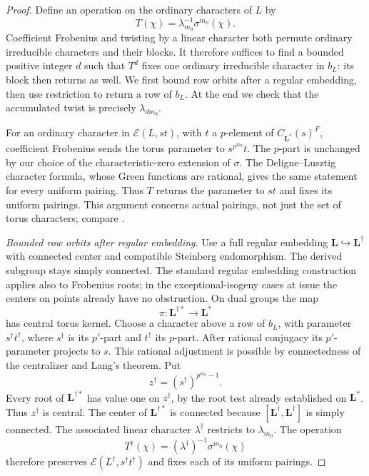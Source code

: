 \begin{proof}
Define an operation on the ordinary characters of $L$ by
\[
 T(\chi)=\lambda_{m_0}^{-1}\sigma^{m_0}(\chi).
\]
Coefficient Frobenius and twisting by a linear character both
permute ordinary irreducible characters and their blocks.  It
therefore suffices to find a bounded positive integer $d$ such
that $T^d$ fixes one ordinary irreducible character in $b_L$: its
block then returns as well.  We first bound row orbits after a
regular embedding, then use restriction to return a row of $b_L$.
At the end we check that the accumulated twist is precisely
$\lambda_{d m_0}$.

For an ordinary character in $\mathcal E(L,st)$, with $t$ a
$p$-element of $C_{\mathbf L^*}(s)^F$, coefficient Frobenius sends
the torus parameter to $s^{p^{m_0}}t$.  The $p$-part is unchanged
by our choice of the characteristic-zero extension of $\sigma$.
The Deligne--Lusztig character formula, whose Green functions are
rational, gives the same statement for every uniform pairing.
Thus $T$ returns the parameter to $st$ and fixes its uniform pairings.
This argument concerns actual pairings, not just the set of torus
characters; compare \cite[Lemma~3.6(i)]{FarrellKessar}.

\emph{Bounded row orbits after regular embedding.}
Use a full regular embedding
$\mathbf L\hookrightarrow\mathbf L^\dagger$ with connected center
and compatible Steinberg endomorphism.  The derived subgroup stays
simply connected.  The standard regular embedding construction
applies also to Frobenius roots; in the exceptional-isogeny cases
at issue the centers on points already have no obstruction.
On dual groups the map
\[
 \pi:\mathbf L^{\dagger *}\longrightarrow\mathbf L^*
\]
has central torus kernel.  Choose a character above a row of $b_L$,
with parameter $s^\dagger t^\dagger$, where $s^\dagger$ is its
$p'$-part and $t^\dagger$ its $p$-part.  After rational conjugacy its
$p'$-parameter projects to $s$.  This rational adjustment is possible
by connectedness of the centralizer and Lang's theorem.  Put
\[
 z^\dagger=(s^\dagger)^{p^{m_0}-1}.
\]
Every root of $\mathbf L^{\dagger *}$ has value one on
$z^\dagger$, by the root test already established on $\mathbf L^*$.
Thus $z^\dagger$ is central.  The center of
$\mathbf L^{\dagger *}$ is connected because
$[\mathbf L^\dagger,\mathbf L^\dagger]$ is simply connected.
The associated linear character $\lambda^\dagger$ restricts to
$\lambda_{m_0}$.  The operation
\[
 T^\dagger(\chi)=(\lambda^\dagger)^{-1}\sigma^{m_0}(\chi)
\]
therefore preserves $\mathcal E(L^\dagger,s^\dagger t^\dagger)$
and fixes each of its uniform pairings.


\end{proof}

